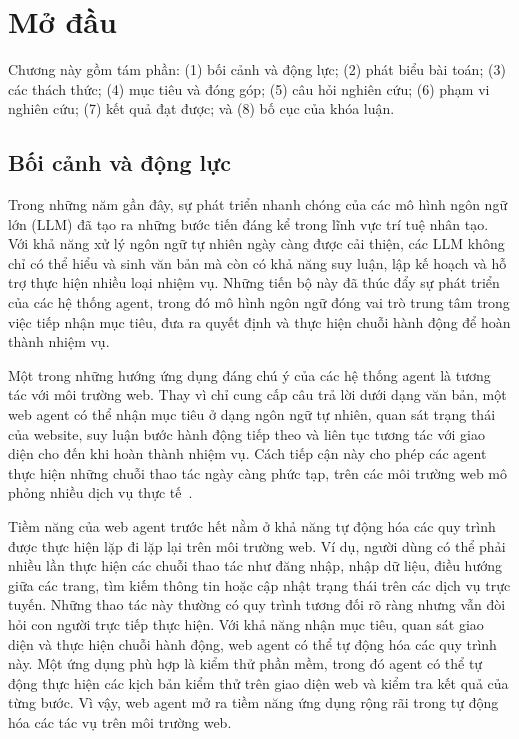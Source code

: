\chapter{Mở đầu}
\label{ch:intro}

Chương này gồm tám phần: (1) bối cảnh và động lực; (2) phát biểu bài toán; (3) các thách thức; (4) mục tiêu và đóng góp; (5) câu hỏi nghiên cứu; (6) phạm vi nghiên cứu; (7) kết quả đạt được; và (8) bố cục của khóa luận.

\section{Bối cảnh và động lực}
\label{sec:intro-context}

Trong những năm gần đây, sự phát triển nhanh chóng của các mô hình ngôn ngữ lớn (LLM) đã tạo ra những bước tiến đáng kể trong lĩnh vực trí tuệ nhân tạo. Với khả năng xử lý ngôn ngữ tự nhiên ngày càng được cải thiện, các LLM không chỉ có thể hiểu và sinh văn bản mà còn có khả năng suy luận, lập kế hoạch và hỗ trợ thực hiện nhiều loại nhiệm vụ. Những tiến bộ này đã thúc đẩy sự phát triển của các hệ thống agent, trong đó mô hình ngôn ngữ đóng vai trò trung tâm trong việc tiếp nhận mục tiêu, đưa ra quyết định và thực hiện chuỗi hành động để hoàn thành nhiệm vụ.

Một trong những hướng ứng dụng đáng chú ý của các hệ thống agent là tương tác với môi trường web. Thay vì chỉ cung cấp câu trả lời dưới dạng văn bản, một web agent có thể nhận mục tiêu ở dạng ngôn ngữ tự nhiên, quan sát trạng thái của website, suy luận bước hành động tiếp theo và liên tục tương tác với giao diện cho đến khi hoàn thành nhiệm vụ. Cách tiếp cận này cho phép các agent thực hiện những chuỗi thao tác ngày càng phức tạp, trên các môi trường web mô phỏng nhiều dịch vụ thực tế~\cite{sodhi2024step, yang2024agentoccam}.

Tiềm năng của web agent trước hết nằm ở khả năng tự động hóa các quy trình được thực hiện lặp đi lặp lại trên môi trường web. Ví dụ, người dùng có thể phải nhiều lần thực hiện các chuỗi thao tác như đăng nhập, nhập dữ liệu, điều hướng giữa các trang, tìm kiếm thông tin hoặc cập nhật trạng thái trên các dịch vụ trực tuyến. Những thao tác này thường có quy trình tương đối rõ ràng nhưng vẫn đòi hỏi con người trực tiếp thực hiện. Với khả năng nhận mục tiêu, quan sát giao diện và thực hiện chuỗi hành động, web agent có thể tự động hóa các quy trình này. Một ứng dụng phù hợp là kiểm thử phần mềm, trong đó agent có thể tự động thực hiện các kịch bản kiểm thử trên giao diện web và kiểm tra kết quả của từng bước. Vì vậy, web agent mở ra tiềm năng ứng dụng rộng rãi trong tự động hóa các tác vụ trên môi trường web.

